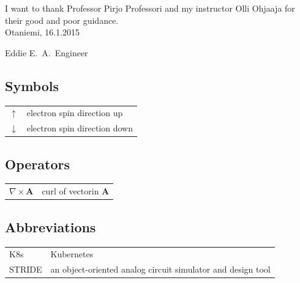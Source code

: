 \documentclass[english,12pt,a4paper,pdftex,sci,utf8]{aaltothesis}
\begin{document}

I want to thank Professor Pirjo Professori
and my instructor Olli Ohjaaja for their
good and poor guidance.\\

\vspace{5cm}
Otaniemi, 16.1.2015

\vspace{5mm}
{\hfill Eddie E.\ A.\ Engineer \hspace{1cm}}

\newpage

\thesistableofcontents


\subsection*{Symbols}

\begin{tabular}{ll}
$\uparrow$       & electron spin direction up\\
$\downarrow$     & electron spin direction down
\end{tabular}

\subsection*{Operators}

\begin{tabular}{ll}
$\nabla \times \mathbf{A}$              & curl of vectorin $\mathbf{A}$\\
\end{tabular}

\subsection*{Abbreviations}

\begin{tabular}{ll}
K8s         & Kubernetes \\
STRIDE      & an object-oriented analog circuit simulator and design tool \\
\end{tabular}


\cleardoublepage
\storeinipagenumber
{}
\setcounter{page}{1}
\end{document}

